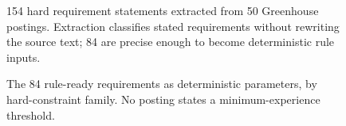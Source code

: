 \documentclass[11pt]{article}
\begin{document}
\begin{figure}[ht]
  \centering
  
  \caption{154 hard requirement statements extracted from 50 Greenhouse
    postings. Extraction classifies stated requirements without rewriting
    the source text; 84 are precise enough to become deterministic rule
    inputs.}
  \label{fig:requirement-statements}
\end{figure}

\begin{figure}[ht]
  \centering
  
  \caption{The 84 rule-ready requirements as deterministic parameters, by
    hard-constraint family. No posting states a minimum-experience
    threshold.}
  \label{fig:constraint-families}
\end{figure}
\end{document}
